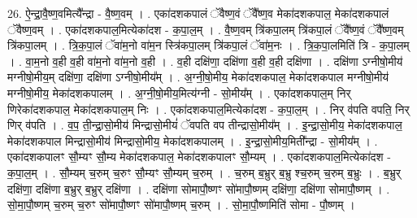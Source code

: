 \documentclass[17pt]{extarticle}
\begin{document}
26. ऐ॒न्द्रा॒वै॒ष्ण॒वमित्यै᳚न्द्रा - वै॒ष्ण॒वम् । . एका॑दशकपालं ॅवैष्ण॒वं ॅवै᳚ष्ण॒व मेका॑दशकपाल॒ मेका॑दशकपालं ॅवैष्ण॒वम् । . एका॑दशकपाल॒मित्येका॑दश - क॒पा॒ल॒म् । . वै॒ष्ण॒वम् त्रि॑कपा॒लम् त्रि॑कपा॒लं ॅवै᳚ष्ण॒वं ॅवै᳚ष्ण॒वम् त्रि॑कपा॒लम् । . त्रि॒क॒पा॒लं ॅवा॑म॒नो वा॑म॒न स्त्रि॑कपा॒लम् त्रि॑कपा॒लं ॅवा॑म॒नः । . त्रि॒क॒पा॒लमिति॑ त्रि - क॒पा॒लम् । . वा॒म॒नो व॒ही व॒ही वा॑म॒नो वा॑म॒नो व॒ही । . व॒ही दक्षि॑णा॒ दक्षि॑णा व॒ही व॒ही दक्षि॑णा । . दक्षि॑णा ऽग्नीषो॒मीय॑ मग्नीषो॒मीय॒म् दक्षि॑णा॒ दक्षि॑णा ऽग्नीषो॒मीय᳚म् । . अ॒ग्नी॒षो॒मीय॒ मेका॑दशकपाल॒ मेका॑दशकपाल मग्नीषो॒मीय॑ मग्नीषो॒मीय॒ मेका॑दशकपालम् । . अ॒ग्नी॒षो॒मीय॒मित्य॑ग्नी - सो॒मीय᳚म् । . एका॑दशकपाल॒म् निर् णिरेका॑दशकपाल॒ मेका॑दशकपाल॒म् निः । . एका॑दशकपाल॒मित्येका॑दश - क॒पा॒ल॒म् । . निर् व॑पति वपति॒ निर् णिर् व॑पति । . व॒प॒ ती॒न्द्रा॒सो॒मीय॑ मिन्द्रासो॒मीयं॑ ॅवपति वप तीन्द्रासो॒मीय᳚म् । . इ॒न्द्रा॒सो॒मीय॒ मेका॑दशकपाल॒ मेका॑दशकपाल मिन्द्रासो॒मीय॑ मिन्द्रासो॒मीय॒ मेका॑दशकपालम् । . इ॒न्द्रा॒सो॒मीय॒मिती᳚न्द्रा - सो॒मीय᳚म् । . एका॑दशकपालꣳ सौ॒म्यꣳ सौ॒म्य मेका॑दशकपाल॒ मेका॑दशकपालꣳ सौ॒म्यम् । . एका॑दशकपाल॒मित्येका॑दश - क॒पा॒ल॒म् । . सौ॒म्यम् च॒रुम् च॒रुꣳ सौ॒म्यꣳ सौ॒म्यम् च॒रुम् । . च॒रुम् ब॒भ्रुर् ब॒भ्रु श्च॒रुम् च॒रुम् ब॒भ्रुः । . ब॒भ्रुर् दक्षि॑णा॒ दक्षि॑णा ब॒भ्रुर् ब॒भ्रुर् दक्षि॑णा । . दक्षि॑णा सोमापौ॒ष्णꣳ सो॑मापौ॒ष्णम् दक्षि॑णा॒ दक्षि॑णा सोमापौ॒ष्णम् । . सो॒मा॒पौ॒ष्णम् च॒रुम् च॒रुꣳ सो॑मापौ॒ष्णꣳ सो॑मापौ॒ष्णम् च॒रुम् । . सो॒मा॒पौ॒ष्णमिति॑ सोमा - पौ॒ष्णम् । \newline
\end{document}
